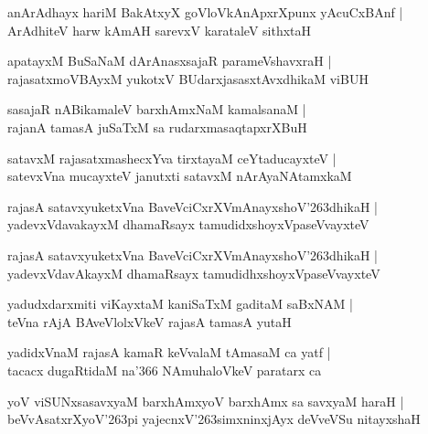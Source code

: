 \documentclass[twoside,12pt,openright]{book}
\def\S{\char'263}
\newcounter{shloka}[chapter]
\begin{document}
\begin{shloka}%
anArAdhayx hariM BakAtxyX goVloVkAnApxrXpunx yAcuCxBAnf |\\
ArAdhiteV harw kAmAH sarevxV karataleV sithxtaH 
\end{shloka}

\begin{shloka}%
apatayxM BuSaNaM dArAnasxsajaR parameVshavxraH |\\
rajasatxmoVBAyxM yukotxV BUdarxjasasxtAvxdhikaM viBUH
\end{shloka}

\begin{shloka}%
sasajaR nABikamaleV barxhAmxNaM kamalsanaM |\\
rajanA tamasA juSaTxM sa rudarxmasaqtapxrXBuH
\end{shloka}

\begin{shloka}%
satavxM rajasatxmashecxYva tirxtayaM ceYtaducayxteV |\\
satevxVna mucayxteV janutxti satavxM nArAyaNAtamxkaM 
\end{shloka}

\begin{shloka}%
rajasA satavxyuketxVna BaveVciCxrXVmAnayxshoV\S dhikaH |\\
yadevxVdavakayxM dhamaRsayx tamudidxshoyxVpaseVvayxteV
\end{shloka}

\begin{shloka}%
rajasA satavxyuketxVna BaveVciCxrXVmAnayxshoV\S dhikaH |\\
yadevxVdavAkayxM dhamaRsayx tamudidhxshoyxVpaseVvayxteV 
\end{shloka}
yadudxdarxmiti viKayxtaM kaniSaTxM gaditaM saBxNAM |\\
teVna rAjA BAveVlolxVkeV rajasA tamasA yutaH 
\begin{shloka}%

\end{shloka}
yadidxVnaM rajasA kamaR keVvalaM tAmasaM ca yatf |\\
tacacx dugaRtidaM na\char'366 NAmuhaloVkeV paratarx ca 
\begin{shloka}%

\end{shloka}

\begin{shloka}%
yoV viSUNxsasavxyaM barxhAmxyoV barxhAmx sa savxyaM haraH |\\
beVvAsatxrXyoV\S pi  yajecnxV\S simxninxjAyx deVveVSu nitayxshaH
\end{shloka}
\end{document}
